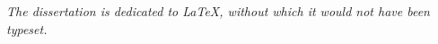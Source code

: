 
\thispagestyle{plain}

\begin{center}
  \vspace*{\fill}

  \it%
  The dissertation is dedicated to \LaTeX, without which it would not have been typeset.

  \vspace*{\fill}
\end{center}

\clearpage

